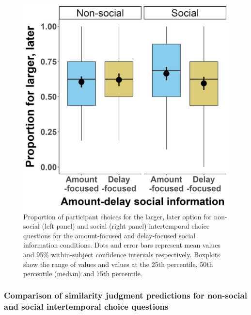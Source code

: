 \documentclass[
  pub,floatsintext]{apa6}
\begin{document}
\begin{figure}
\includegraphics[width=1\linewidth]{figures/itc_social_info_2} \caption{Proportion of participant choices for the larger, later option for non-social (left panel) and social (right panel) intertemporal choice questions for the amount-focused and delay-focused social information conditions. Dots and error bars represent mean values and 95\% within-subject confidence intervals respectively. Boxplots show the range of values and values at the 25th percentile, 50th percentile (median) and 75th percentile.}\label{fig:socialinfoitccomparison2}
\end{figure}

\hypertarget{comparison-of-similarity-judgment-predictions-for-non-social-and-social-intertemporal-choice-questions-1}{%
\subsubsection{Comparison of similarity judgment predictions for non-social and social intertemporal choice questions}\label{comparison-of-similarity-judgment-predictions-for-non-social-and-social-intertemporal-choice-questions-1}}
\end{document}
